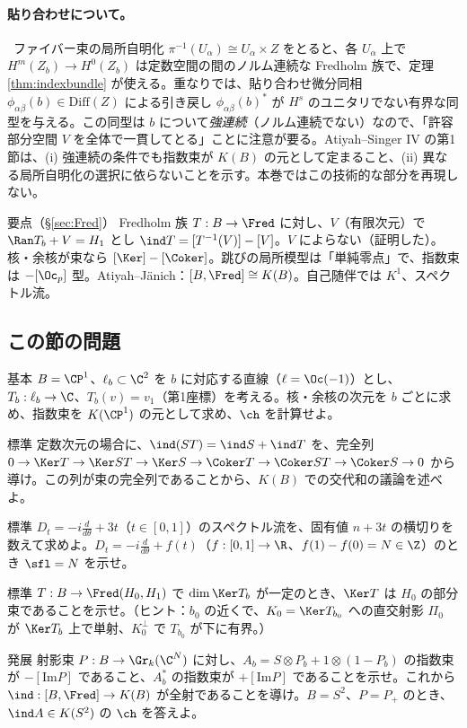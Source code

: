 \paragraph{貼り合わせについて。}\tQ\ ファイバー束の局所自明化 $\pi^{-1}(U_\alpha)\cong U_\alpha\times Z$ をとると、各 $U_\alpha$ 上で $H^m(Z_b)\to H^0(Z_b)$ は定数空間の間のノルム連続な Fredholm 族で、定理 \ref{thm:indexbundle} が使える。重なりでは、貼り合わせ微分同相 $\phi_{\alpha\beta}(b)\in\mathrm{Diff}(Z)$ による引き戻し $\phi_{\alpha\beta}(b)^*$ が $H^s$ のユニタリでない有界な同型を与える。この同型は $b$ について\emph{強連続}（ノルム連続でない）なので、「許容部分空間 $V$ を全体で一貫してとる」ことに注意が要る。Atiyah--Singer IV の第1節\tQ は、(i) 強連続の条件でも指数束が $K(B)$ の元として定まること、(ii) 異なる局所自明化の選択に依らないことを示す。本巻ではこの技術的な部分を再現しない。

\begin{keybox}{要点（\S\ref{sec:Fred}）}
Fredholm 族 $T:B\to\Fred$ に対し、$V$（有限次元）で $\Ran T_b+V=H_1$ とし $\ind T=[T^{-1}(V)]-[V]$。$V$ によらない（証明した）。核・余核が束なら $[\Ker]-[\Coker]$。跳びの局所模型は「単純零点」で、指数束は $-[\Oc_p]$ 型。Atiyah--J\"anich：$[B,\Fred]\cong K(B)$。自己随伴では $K^1$、スペクトル流。
\end{keybox}

\subsection*{この節の問題}
\begin{prob}{基本}\label{p:CP1jump}
$B=\CP^1$、$\ell_b\subset\C^2$ を $b$ に対応する直線（$\ell=\Oc(-1)$）とし、$T_b:\ell_b\to\C$、$T_b(v)=v_1$（第1座標）を考える。核・余核の次元を $b$ ごとに求め、指数束を $K(\CP^1)$ の元として求め、$\ch$ を計算せよ。
\end{prob}
\begin{prob}{標準}\label{p:additive}
定数次元の場合に、$\ind(ST)=\ind S+\ind T$ を、完全列 $0\to\Ker T\to\Ker ST\to\Ker S\to\Coker T\to\Coker ST\to\Coker S\to0$ から導け。この列が束の完全列であることから、$K(B)$ での交代和の議論を述べよ。
\end{prob}
\begin{prob}{標準}\label{p:SFprob}
$D_t=-i\frac d{d\theta}+3t$（$t\in[0,1]$）のスペクトル流を、固有値 $n+3t$ の横切りを数えて求めよ。$D_t=-i\frac d{d\theta}+f(t)$（$f:[0,1]\to\R$、$f(1)-f(0)=N\in\Z$）のとき $\sfl=N$ を示せ。
\end{prob}
\begin{prob}{標準}\label{p:kerbundle}
$T:B\to\Fred(H_0,H_1)$ で $\dim\Ker T_b$ が一定のとき、$\Ker T$ は $H_0$ の部分束であることを示せ。（ヒント：$b_0$ の近くで、$K_0=\Ker T_{b_0}$ への直交射影 $\Pi_0$ が $\Ker T_b$ 上で単射、$K_0^\perp$ で $T_{b_0}$ が下に有界。）
\end{prob}
\begin{prob}{発展}\label{p:projbundle}
射影束 $P:B\to\Gr_k(\C^N)$ に対し、$A_b=S\otimes P_b+1\otimes(1-P_b)$ の指数束が $-[\mathrm{Im}P]$ であること、$A_b^*$ の指数束が $+[\mathrm{Im}P]$ であることを示せ。これから $\ind:[B,\Fred]\to K(B)$ が全射であることを導け。$B=S^2$、$P=P_+$ のとき、$\ind A\in K(S^2)$ の $\ch$ を答えよ。
\end{prob}
